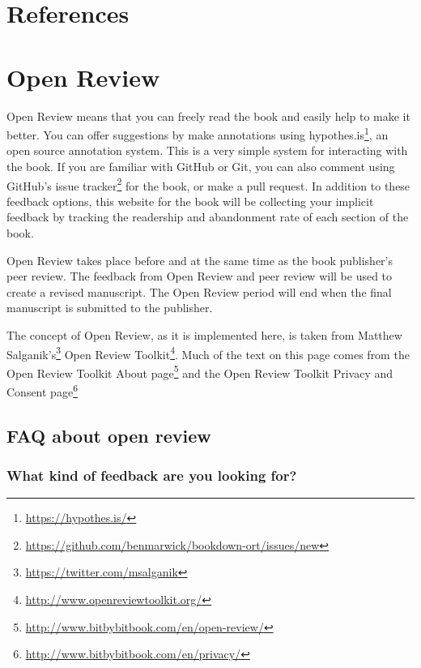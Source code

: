 \documentclass[12pt,]{krantz}
\renewcommand{\href}[2]{#2\footnote{\url{#1}}}
\theoremstyle{definition}
\theoremstyle{definition}
\theoremstyle{definition}
\theoremstyle{remark}
\begin{document}
\hypertarget{references}{%
\chapter*{References}\label{references}}


\hypertarget{open-review}{%
\chapter*{Open Review}\label{open-review}}


Open Review means that you can freely read the book and easily help to
make it better. You can offer suggestions by make annotations using
\href{https://hypothes.is/}{hypothes.is}, an open source annotation
system. This is a very simple system for interacting with the book. If
you are familiar with GitHub or Git, you can also comment using
\href{https://github.com/benmarwick/bookdown-ort/issues/new}{GitHub's
issue tracker} for the book, or make a pull request. In addition to
these feedback options, this website for the book will be collecting
your implicit feedback by tracking the readership and abandonment rate
of each section of the book.

Open Review takes place before and at the same time as the book
publisher's peer review. The feedback from Open Review and peer review
will be used to create a revised manuscript. The Open Review period will
end when the final manuscript is submitted to the publisher.

The concept of Open Review, as it is implemented here, is taken from
\href{https://twitter.com/msalganik}{Matthew Salganik's}
\href{http://www.openreviewtoolkit.org/}{Open Review Toolkit}. Much of
the text on this page comes from the
\href{http://www.bitbybitbook.com/en/open-review/}{Open Review Toolkit
About page} and the \href{http://www.bitbybitbook.com/en/privacy/}{Open
Review Toolkit Privacy and Consent page}

\hypertarget{faq-about-open-review}{%
\section*{FAQ about open review}\label{faq-about-open-review}}


\hypertarget{what-kind-of-feedback-are-you-looking-for}{%
\subsection*{What kind of feedback are you looking
for?}\label{what-kind-of-feedback-are-you-looking-for}}
\end{document}

